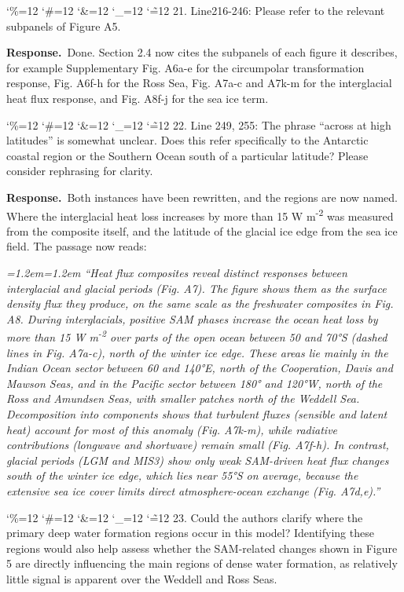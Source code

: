 \documentclass[11pt,a4paper]{article}
\newcommand{\comment}[1]{\par\medskip\noindent\color{black}\begingroup\catcode`\%=12 \catcode`\#=12 \catcode`\&=12 \catcode`\_=12 \catcode`\~=12 \commentbody}
\newcommand{\commentbody}[1]{#1\endgroup\par\smallskip}
\newcommand{\response}{\par\noindent\color{chgcol}\textbf{Response.}\ }
\newenvironment{change}{\par\smallskip\color{chgcol}\small\itshape\leftskip=1.2em\rightskip=1.2em\noindent\ignorespaces}{\par\smallskip}
\begin{document}
\comment{R1}{21. Line216-246: Please refer to the relevant subpanels of Figure A5.}

\response Done. Section 2.4 now cites the subpanels of each figure it describes, for example Supplementary Fig. A6a-e for the circumpolar transformation response, Fig. A6f-h for the Ross Sea, Fig. A7a-c and A7k-m for the interglacial heat flux response, and Fig. A8f-j for the sea ice term.

\comment{R1}{22. Line 249, 255: The phrase ``across at high latitudes'' is somewhat unclear. Does this refer specifically to the Antarctic coastal region or the Southern Ocean south of a particular latitude? Please consider rephrasing for clarity.}

\response Both instances have been rewritten, and the regions are now named. Where the interglacial heat loss increases by more than 15 W m\textsuperscript{-2} was measured from the composite itself, and the latitude of the glacial ice edge from the sea ice field. The passage now reads:

\begin{change}
``Heat flux composites reveal distinct responses between interglacial and glacial periods (Fig. A7). The figure shows them as the surface density flux they produce, on the same scale as the freshwater composites in Fig. A8. During interglacials, positive SAM phases increase the ocean heat loss by more than 15 W m\textsuperscript{-2} over parts of the open ocean between 50 and 70°S (dashed lines in Fig. A7a-c), north of the winter ice edge. These areas lie mainly in the Indian Ocean sector between 60 and 140°E, north of the Cooperation, Davis and Mawson Seas, and in the Pacific sector between 180° and 120°W, north of the Ross and Amundsen Seas, with smaller patches north of the Weddell Sea. Decomposition into components shows that turbulent fluxes (sensible and latent heat) account for most of this anomaly (Fig. A7k-m), while radiative contributions (longwave and shortwave) remain small (Fig. A7f-h). In contrast, glacial periods (LGM and MIS3) show only weak SAM-driven heat flux changes south of the winter ice edge, which lies near 55°S on average, because the extensive sea ice cover limits direct atmosphere-ocean exchange (Fig. A7d,e).''
\end{change}



\comment{R1}{23. Could the authors clarify where the primary deep water formation regions occur in this model? Identifying these regions would also help assess whether the SAM-related changes shown in Figure 5 are directly influencing the main regions of dense water formation, as relatively little signal is apparent over the Weddell and Ross Seas.}
\end{document}
